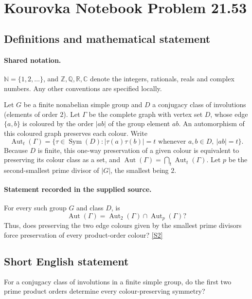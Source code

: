 \documentclass[11pt]{article}
\newcommand{\sref}[2]{\hyperlink{source:#1:#2}{[S#2]}}
\begin{document}
\section{Kourovka Notebook Problem 21.53}\label{statement}

\subsection{Definitions and mathematical statement}

\paragraph{Shared notation.}$\mathbb N=\{1,2,\ldots\}$, and $\mathbb Z,\mathbb Q,\mathbb R,\mathbb C$ denote the integers, rationals, reals and complex numbers. Any other conventions are specified locally.


Let $G$ be a finite nonabelian simple group and $D$ a conjugacy class of involutions (elements of order $2$). Let $\Gamma$ be the complete graph with vertex set $D$, whose edge $\{a,b\}$ is coloured by the order $|ab|$ of the group element $ab$. An automorphism of this coloured graph preserves each colour. Write
\[
 \operatorname{Aut}_t(\Gamma)=\{\tau\in\operatorname{Sym}(D): |\tau(a)\tau(b)|=t\text{ whenever }a,b\in D,\ |ab|=t\}.
\]
Because $D$ is finite, this one-way preservation of a given colour is equivalent to preserving its colour class as a set, and $\operatorname{Aut}(\Gamma)=\bigcap_t\operatorname{Aut}_t(\Gamma)$. Let $p$ be the second-smallest prime divisor of $|G|$, the smallest being $2$.
\paragraph{Statement recorded in the supplied source.}
For every such group $G$ and class $D$, is
\[
 \operatorname{Aut}(\Gamma)=\operatorname{Aut}_2(\Gamma)\cap\operatorname{Aut}_p(\Gamma)?
\]
Thus, does preserving the two edge colours given by the smallest prime divisors force preservation of every product-order colour? \sref{statement}{2}
\subsection{Short English statement}
For a conjugacy class of involutions in a finite simple group, do the first two prime product orders determine every colour-preserving symmetry?
\end{document}
